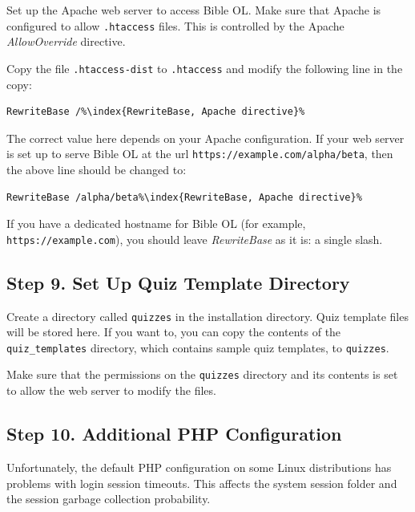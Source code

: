 \documentclass[11pt,oneside,a4paper]{memoir}
\begin{document}
Set up the Apache web server to access Bible OL. Make sure that Apache is configured to allow
\texttt{.htaccess} files. This is controlled by the Apache
\emph{AllowOverride} directive.

Copy the file \texttt{.htaccess-dist} to \texttt{.htaccess} and modify the following line in the
copy:

\begin{lstlisting}
RewriteBase /%\index{RewriteBase, Apache directive}%
\end{lstlisting}

The correct value here depends on your Apache configuration. If your web server is set up to serve
Bible OL at the url \texttt{https://example.com/alpha/beta}, then the above line should be changed to:

\begin{lstlisting}
RewriteBase /alpha/beta%\index{RewriteBase, Apache directive}%
\end{lstlisting}

If you have a dedicated hostname for Bible OL (for example, \texttt{https://example.com}), you should
leave \emph{RewriteBase} as it is: a single slash.

\subsection{Step 9. Set Up Quiz Template Directory}

Create a directory called \texttt{quizzes} in the installation directory. Quiz template files will
be stored here. If you want to, you can copy the contents of the \texttt{quiz\_templates} directory,
which contains sample quiz templates, to \texttt{quizzes}.

Make sure that the permissions on the \texttt{quizzes} directory and its contents is set to allow
the web server to modify the files.

\subsection{Step 10. Additional PHP Configuration}

Unfortunately, the default PHP configuration on some Linux distributions has problems with login
session timeouts. This affects the system session folder and the session garbage
collection probability.
\end{document}
